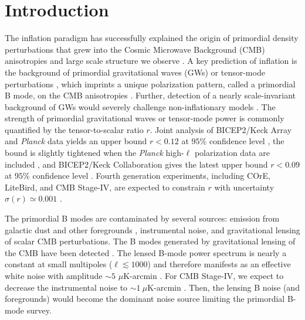 \documentclass[aps, prd, reprint, nofootinbib, groupedaddress, showpacs]{revtex4-1}
\def\Planck{\emph{Planck} }
\begin{document}
\section{\label{sec:intro}Introduction}
The inflation paradigm has successfully explained the origin of primordial density
perturbations that grew into the Cosmic Microwave Background (CMB)
anisotropies and large scale structure we
observe \citep[e.g.][]{Mukhanov1981, Guth1981, Linde1982, Albrecht1982, Lidsey1997, Lyth1999}.
A key prediction of inflation is the background of primordial
gravitational waves (GWs) or tensor-mode perturbations
\citep[e.g.][]{Starobinskii1979, Rubakov1982, Fabbri1983,%
Abbott1984, Starobinskii1985},
which imprints a unique polarization pattern,
called a primordial B mode, on the CMB anisotropies
\cite{Stebbins1996, Kamionkowski1997a, Kamionkowski1997,Seljak1997,%
Seljak1997a,Zaldarriaga1997a}.
Further, detection of a nearly scale-invariant background of
GWs would severely challenge non-inflationary models
\cite[e.g.][]{Khoury2001, Khoury2001a,Khoury2003a,Steinhardt2002, Boyle2004a}.
The strength of primordial gravitational waves or tensor-mode power is commonly
quantified by the tensor-to-scalar ratio $r$.
Joint analysis of BICEP2/Keck Array and \Planck data yields an upper bound
$r < 0.12$ at $95\%$ confidence level \citep{BICEP2/Keck2015},
the bound is slightly tightened  when the \Planck high-$\ell$
polarization data are included \citep{PlanckCollaborationXX2015},
and BICEP2/Keck Collaboration gives the latest upper bound $r < 0.09$ at
$95\%$ confidence level \citep{BICEP2/Keck2016}.
Fourth generation experiments,
including COrE, LiteBird, and CMB Stage-IV,  are expected to
constrain $r$ with uncertainty $\sigma(r)\simeq 0.001$
\citep{COrECollaboration2011, LiteBirdCollaboration2014,%
LiteBird2016, s42016,Cabass2016, Kamionkowski2016, Delabrouille2017}.

The primordial B modes are contaminated by several sources:
emission from galactic dust and other foregrounds
\cite{Hildebrand1999, Draine2004, Benoit2004,Mortonson2014, Niemack2015,%
PlanckCollaborationXXX2016, PlanckCollaborationL2016, Krachmalnicoff2016},
instrumental noise, and gravitational lensing of scalar CMB perturbations.
The B modes generated by gravitational lensing of the CMB have  been detected
\citep{Hanson2013, Ade2014, VanEngelen2014, Story2014, BICEP2/Keck2015, PlanckCollaboration2015a}.
The lensed B-mode power spectrum is nearly a constant at small multipoles ($\ell \lesssim 1000$) and
therefore manifests as an effective white noise with amplitude $\sim 5$ $\mu$K-arcmin
\citep{Lewis2006, Sherwin2015}.
For CMB Stage-IV, we expect to decrease the instrumental noise to $\sim 1\ \mu$K-arcmin \citep{s42016}.
Then, the lensing B noise (and foregrounds) would become the dominant noise source
limiting the primordial B-mode survey.
\end{document}
